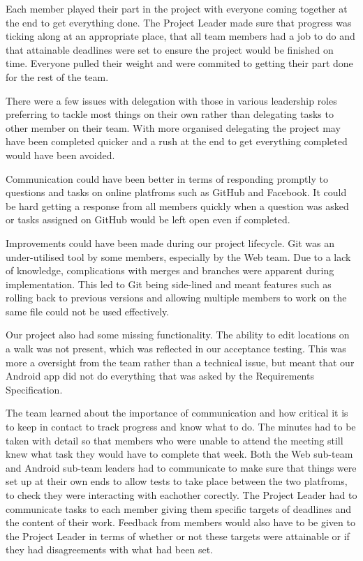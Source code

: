 \documentclass{project}
\begin{document}
Each member played their part in the project with everyone coming together at the end to get everything done. The Project Leader made sure that progress was ticking along at an appropriate place, that all team members had a job to do and that attainable deadlines were set to ensure the project would be finished on time. Everyone pulled their weight and were commited to getting their part done for the rest of the team.

There were a few issues with delegation with those in various leadership roles preferring to tackle most things on their own rather than delegating tasks to other member on their team. With more organised delegating the project may have been completed quicker and a rush at the end to get everything completed would have been avoided.

Communication could have been better in terms of responding promptly to questions and tasks on online platfroms such as GitHub and Facebook. It could be hard getting a response from all members quickly when a question was asked or tasks assigned on GitHub would be left open even if completed.

Improvements could have been made during our project lifecycle. Git was an under-utilised tool by some members, especially by the Web team. Due to a lack of knowledge, complications with merges and branches were apparent during implementation. This led to Git being side-lined and meant features such as rolling back to previous versions and allowing multiple members to work on the same file could not be used effectively.

Our project also had some missing functionality. The ability to edit locations on a walk was not present, which was reflected in our acceptance testing. This was more a oversight from the team rather than a technical issue, but meant that our Android app did not do everything that was asked by the Requirements Specification. 

The team learned about the importance of communication and how critical it is to keep in contact to track progress and know what to do. The minutes had to be taken with detail so that members who were unable to attend the meeting still knew what task they would have to complete that week. Both the Web sub-team and Android sub-team leaders had to communicate to make sure that things were set up at their own ends to allow tests to take place between the two platfroms, to check they were interacting with eachother corectly. The Project Leader had to communicate tasks to each member giving them specific targets of deadlines and the content of their work. Feedback from members would also have to be given to the Project Leader in terms of whether or not these targets were attainable or if they had disagreements with what had been set.
\end{document}
